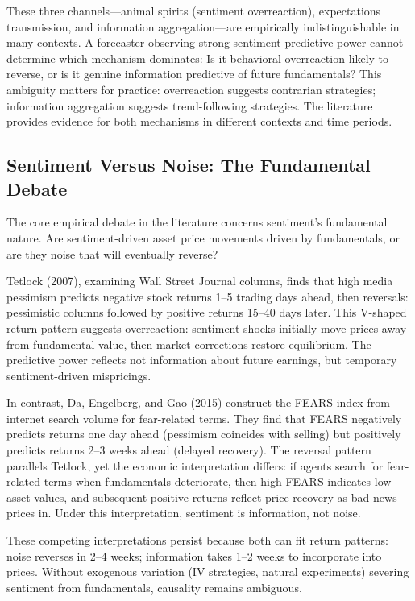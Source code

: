 \documentclass[11pt]{article}
\begin{document}
These three channels---animal spirits (sentiment overreaction), expectations transmission, and information aggregation---are empirically indistinguishable in many contexts. A forecaster observing strong sentiment predictive power cannot determine which mechanism dominates: Is it behavioral overreaction likely to reverse, or is it genuine information predictive of future fundamentals? This ambiguity matters for practice: overreaction suggests contrarian strategies; information aggregation suggests trend-following strategies. The literature provides evidence for both mechanisms in different contexts and time periods.

\subsection{Sentiment Versus Noise: The Fundamental Debate}

The core empirical debate in the literature concerns sentiment's fundamental nature. Are sentiment-driven asset price movements driven by fundamentals, or are they noise that will eventually reverse?

Tetlock (2007), examining Wall Street Journal columns, finds that high media pessimism predicts negative stock returns 1--5 trading days ahead, then reversals: pessimistic columns followed by positive returns 15--40 days later. This V-shaped return pattern suggests overreaction: sentiment shocks initially move prices away from fundamental value, then market corrections restore equilibrium. The predictive power reflects not information about future earnings, but temporary sentiment-driven mispricings.

In contrast, Da, Engelberg, and Gao (2015) construct the FEARS index from internet search volume for fear-related terms. They find that FEARS negatively predicts returns one day ahead (pessimism coincides with selling) but positively predicts returns 2--3 weeks ahead (delayed recovery). The reversal pattern parallels Tetlock, yet the economic interpretation differs: if agents search for fear-related terms when fundamentals deteriorate, then high FEARS indicates low asset values, and subsequent positive returns reflect price recovery as bad news prices in. Under this interpretation, sentiment is information, not noise.

These competing interpretations persist because both can fit return patterns: noise reverses in 2--4 weeks; information takes 1--2 weeks to incorporate into prices. Without exogenous variation (IV strategies, natural experiments) severing sentiment from fundamentals, causality remains ambiguous.
\end{document}
